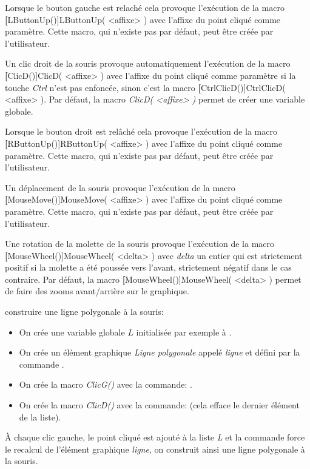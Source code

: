 Lorsque le bouton gauche est relaché cela provoque l'exécution de la macro \textbf[LButtonUp()]{LButtonUp( <affixe> )} avec l'affixe du point cliqué comme paramètre. Cette macro, qui n'existe pas par défaut, peut être créée par l'utilisateur.

Un clic droit de la souris provoque automatiquement l'exécution de la macro \textbf[ClicD()]{ClicD( <affixe> )} avec l'affixe du point cliqué comme paramètre si la touche \textsl{Ctrl} n'est pas enfoncée, sinon c'est la macro \textbf[CtrlClicD()]{CtrlClicD( <affixe> )}. Par défaut, la macro \textsl{ClicD( <affixe> )} permet de créer une variable globale.

Lorsque le bouton droit est relâché cela provoque l'exécution de la macro \textbf[RButtonUp()]{RButtonUp( <affixe> )} avec l'affixe du point cliqué comme paramètre. Cette macro, qui n'existe pas par défaut, peut être créée par l'utilisateur.

Un déplacement de la souris provoque l'exécution de la macro \textbf[MouseMove()]{MouseMove( <affixe> )} avec l'affixe du point cliqué comme paramètre. Cette macro, qui n'existe pas par défaut, peut être créée par l'utilisateur.

Une rotation de la molette de la souris provoque l'exécution de la macro \textbf[MouseWheel()]{MouseWheel( <delta> )} avec \textit{delta} un entier qui est strictement positif si la molette a été poussée vers l'avant, strictement négatif dans le cas contraire. Par défaut, la macro \textbf[MouseWheel()]{MouseWheel( <delta> )} permet de faire des zooms avant/arrière sur le graphique.

\exem construire une ligne polygonale à la souris:

\begin{itemize}
 \item On crée une variable globale $L$ initialisée par exemple à \Nil.
 \item On crée un élément graphique \textit{Ligne polygonale} appelé \textit{ligne} et défini par la commande .
 \item On crée la macro \textsl{ClicG()} avec la commande: .
 \item On crée la macro \textsl{ClicD()} avec la commande:  (cela efface le dernier élément de la liste).
\end{itemize}

À chaque clic gauche, le point cliqué est ajouté à la liste \textsl{L} et la commande  force le
recalcul de l'élément graphique \textsl{ligne}, on construit ainsi une ligne polygonale à la souris.


